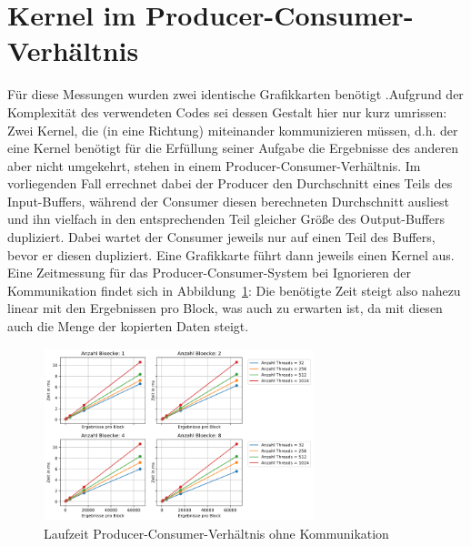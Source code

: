 \documentclass[11pt, abstract=on]{scrartcl}
\begin{document}
\section{Kernel im Producer-Consumer-Verhältnis}
Für diese Messungen wurden zwei identische Grafikkarten benötigt .Aufgrund der Komplexität des verwendeten Codes sei dessen Gestalt hier nur kurz umrissen: Zwei Kernel, die (in eine Richtung) miteinander kommunizieren müssen, d.h. der eine Kernel benötigt für die Erfüllung seiner Aufgabe die Ergebnisse des anderen aber nicht umgekehrt, stehen in einem Producer-Consumer-Verhältnis. Im vorliegenden Fall errechnet dabei der Producer den Durchschnitt eines Teils des Input-Buffers, während der Consumer diesen berechneten Durchschnitt ausliest und ihn vielfach in den entsprechenden Teil gleicher Größe des Output-Buffers dupliziert. Dabei wartet der Consumer jeweils nur auf einen Teil des Buffers, bevor er diesen dupliziert. Eine Grafikkarte führt dann jeweils einen Kernel aus.
Eine Zeitmessung für das Producer-Consumer-System bei Ignorieren der Kommunikation findet sich in Abbildung~\ref{fig:KommunikationOhne}: Die benötigte Zeit steigt also nahezu linear mit den Ergebnissen pro Block, was auch zu erwarten ist, da mit diesen auch die Menge der kopierten Daten steigt.

\begin{figure} [htbp]
 	\centering
 		\includegraphics[width=0.7\textwidth]{Graph_KommunikationOhne.png}
 	\caption{Laufzeit Producer-Consumer-Verhältnis ohne Kommunikation}
 	\label{fig:KommunikationOhne}
\end{figure}
\end{document}
